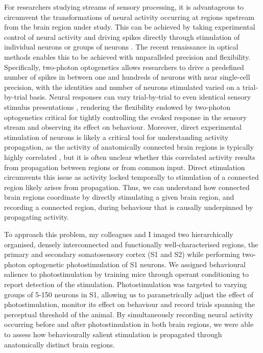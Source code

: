 For researchers studying streams of sensory processing, it is advantageous to circumvent the transformations of neural activity occurring at regions upstream from the brain region under study. This can be achieved by taking experimental control of neural activity and driving spikes directly through stimulation of individual neurons \cite{houweling_behavioural_2008, tanke_single-cell_2018, chettih_single-neuron_2019} or groups of neurons \cite{romo_somatosensory_1998, huber_sparse_2008, histed_cortical_2014, dalgleish_how_2020, gill_precise_2020}. The recent renaissance in optical methods enables this to be achieved with unparalleled precision and flexibility. Specifically, two-photon optogenetics allows researchers to drive a predefined number of spikes in between one and hundreds of neurons with near single-cell precision, with the identities and number of neurons stimulated varied on a trial-by-trial basis. Neural responses can vary trial-by-trial to even identical sensory stimulus presentations \cite{britten_responses_1993, faisal_noise_2008, softky_highly_1993}, rendering the flexibility endowed by two-photon optogenetics critical for tightly controlling the evoked response in the sensory stream and observing its effect on behaviour. Moreover, direct experimental stimulation of neurons is likely a critical tool for understanding activity propagation, as the activity of anatomically connected brain regions is typically highly correlated \cite{honey_predicting_2009, musall_single-trial_2019}, but it is often unclear whether this correlated activity results from propagation between regions or from common input. Direct stimulation circumvents this issue as activity locked temporally to stimulation of a connected region likely arises from propagation. Thus, we can understand how connected brain regions coordinate by directly stimulating a given brain region, and recording a connected region, during behaviour that is causally underpinned by propagating activity.

To approach this problem, my colleagues and I imaged two hierarchically organised, densely interconnected and functionally well-characterised \cite{pons_physiological_1987, kamatani_experience-dependent_2007, aronoff_long-range_2010, chen_behaviour-dependent_2013, yamashita_membrane_2013, chen_long-range_2016, kwon_sensory_2016, yamashita_target-specific_2016} regions, the primary and secondary somatosensory cortex (S1 and S2) while performing two-photon optogenetic photostimulation of S1 neurons. We assigned behavioural salience to photostimulation by training mice through operant conditioning to report detection of the stimulation. Photostimulation was targeted to varying groups of 5-150 neurons in S1, allowing us to parametrically adjust the effect of photostimulation, monitor its effect on behaviour and record trials spanning the perceptual threshold of the animal. By simultaneously recording neural activity occurring before and after photostimulation in both brain regions, we were able to assess how behaviourally salient stimulation is propagated through anatomically distinct brain regions.

